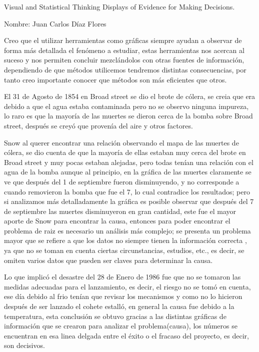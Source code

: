 \documentclass{article}\usepackage[]{graphicx}\usepackage[]{color}
\begin{document}
\raggedright

{ \setlength{\parskip}{3mm} \Large Visual and Statistical Thinking Displays of Evidence for Making Decisions.

Nombre: Juan Carlos D\'iaz Flores}

{\setlength{\parskip}{7mm} \large Creo que el utilizar herramientas como gr\'aficas siempre ayudan a observar de forma m\'as detallada el fen\'omeno a estudiar, estas herramientas nos acercan al suceso y nos permiten concluir mezcl\'andolos con otras fuentes de informaci\'on, dependiendo de que m\'etodos utilicemos tendremos distintas consecuencias, por tanto creo importante conocer que m\'etodos son m\'as eficientes que otros.}

{\setlength{\parskip}{7mm} \large El 31 de Agosto de 1854 en Broad street se dio el brote de c\'olera, se creia que era debido a que el agua estaba contaminada pero no se observo ninguna impureza, lo raro es que la mayor\'ia de las muertes se dieron cerca de la bomba sobre Broad street, despu\'es se crey\'o que proven\'ia del aire y otros factores.}

{\setlength{\parskip}{7mm} \large Snow al querer encontrar una relaci\'on observando el mapa de las muertes de c\'olera, se dio cuenta de que la mayor\'ia de ellas estaban muy cerca del brote en Broad street y muy pocas estaban alejadas, pero todas ten\'ian una relaci\'on con el agua de la bomba aunque al principio, en la gr\'afica de las muertes claramente se ve que despu\'es del 1 de septiembre fueron disminuyendo, y no corresponde a cuando removieron la bomba que fue el 7, lo cual contradice los resultados; pero si analizamos m\'as detalladamente la gr\'afica es posible observar que despu\'es del 7 de septiembre las muertes disminuyeron en gran cantidad, este fue el mayor aporte de Snow para encontrar la causa, entonces para poder encontrar el problema de raiz es necesario un an\'alisis m\'as complejo; se presenta un problema mayor que se refiere a que los datos no siempre tienen la informaci\'on correcta , ya que no se toman en cuenta ciertas circunstancias, estudios, etc., es decir, se omiten varios datos que pueden ser claves para determinar la causa.}

{\setlength{\parskip}{7mm} \large Lo que implic\'o el desastre del 28 de Enero de 1986 fue que no se tomaron las medidas adecuadas para el lanzamiento, es decir, el riesgo no se tom\'o en cuenta, ese d\'ia debido al frio ten\'ian que revisar los mecanismos y como no lo hicieron despu\'es de ser lanzado el cohete estall\'o, en general la causa fue debido a la temperatura, esta conclusi\'on se obtuvo gracias a las distintas gr\'aficas de informaci\'on que se crearon para analizar el problema(causa), los n\'umeros se encuentran en esa linea delgada entre el \'exito o el fracaso del proyecto, es decir, son decisivos.}
\end{document}
